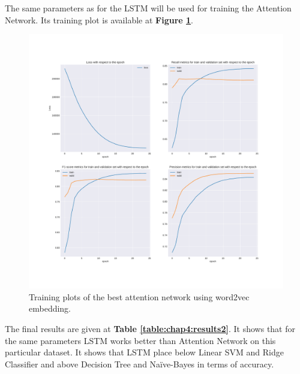 The same parameters as for the LSTM will be used for training the Attention Network. Its training plot is available at \textbf{Figure \ref{chap4:fig:attention5}}.
\begin{figure}
 \centering
 \includegraphics[width=\textwidth]{images/chapitre4/attention5}
 \caption{Training plots of the best attention network using word2vec embedding.}
 \label{chap4:fig:attention5}
\end{figure} 
The final results are given at \textbf{Table \ref{table:chap4:results2}}. It shows that for the same parameters LSTM works better than Attention Network on this particular dataset. It shows that LSTM place below Linear SVM and Ridge Classifier and above Decision Tree and Na\"{i}ve-Bayes in terms of accuracy. 
